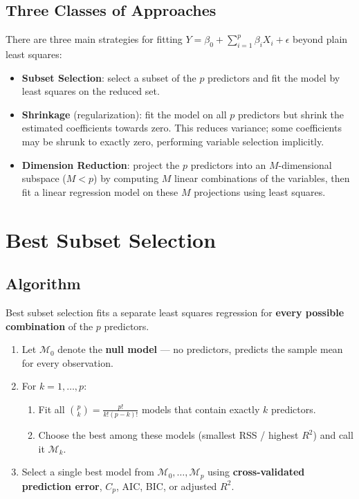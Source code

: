 \documentclass[11pt,a4paper]{article}
\theoremstyle{definition}
\theoremstyle{plain}
\theoremstyle{remark}
\begin{document}
\subsection{Three Classes of Approaches}

There are three main strategies for fitting $Y = \beta_0 + \sum_{i=1}^p \beta_i X_i + \epsilon$ beyond plain least squares:

\begin{itemize}
    \item \textbf{Subset Selection}: select a subset of the $p$ predictors and fit the model by least squares on the reduced set.
    \item \textbf{Shrinkage} (regularization): fit the model on all $p$ predictors but shrink the estimated coefficients towards zero. This reduces variance; some coefficients may be shrunk to exactly zero, performing variable selection implicitly.
    \item \textbf{Dimension Reduction}: project the $p$ predictors into an $M$-dimensional subspace ($M < p$) by computing $M$ linear combinations of the variables, then fit a linear regression model on these $M$ projections using least squares.
\end{itemize}


\section{Best Subset Selection}

\subsection{Algorithm}

Best subset selection fits a separate least squares regression for \textbf{every possible combination} of the $p$ predictors.

\begin{enumerate}
    \item Let $\mathcal{M}_0$ denote the \textbf{null model} — no predictors, predicts the sample mean for every observation.
    \item For $k = 1, \ldots, p$:
        \begin{enumerate}[label=(\alph*)]
            \item Fit all $\binom{p}{k} = \frac{p!}{k!(p-k)!}$ models that contain exactly $k$ predictors.
            \item Choose the best among these models (smallest RSS / highest $R^2$) and call it $\mathcal{M}_k$.
        \end{enumerate}
    \item Select a single best model from $\mathcal{M}_0, \ldots, \mathcal{M}_p$ using \textbf{cross-validated prediction error}, $C_p$, AIC, BIC, or adjusted $R^2$.
\end{enumerate}
\end{document}

